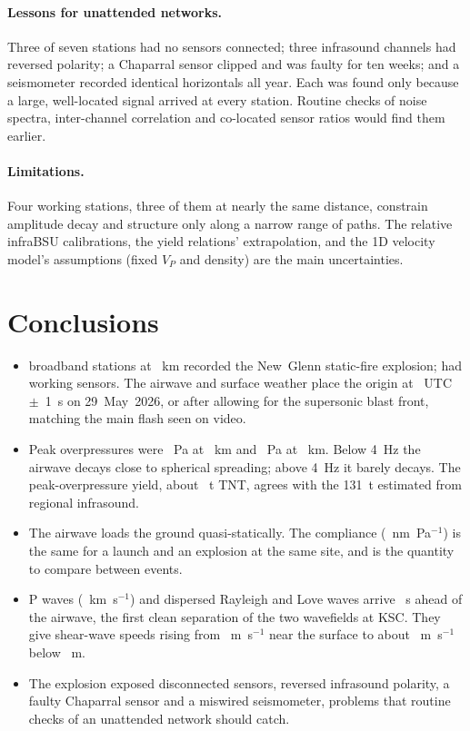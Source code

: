 \documentclass[]{seismica}
\begin{document}
\paragraph{Lessons for unattended networks.} Three of seven stations had
no sensors connected; three infrasound channels had reversed polarity; a
Chaparral sensor clipped and was faulty for ten weeks; and a seismometer
recorded identical horizontals all year. Each was found only because a
large, well-located signal arrived at every station. Routine checks of
noise spectra, inter-channel correlation and co-located sensor ratios
would find them earlier.

\paragraph{Limitations.} Four working stations, three of them at nearly
the same distance, constrain amplitude decay and structure only along a
narrow range of paths. The relative infraBSU calibrations, the yield
relations' extrapolation, and the 1D velocity model's assumptions (fixed
$V_P$ and density) are the main uncertainties.

\section{Conclusions}

\begin{itemize}
  \item \NGnStationsCap{} broadband stations at \NGdistRange~km recorded the New~Glenn
    static-fire explosion; \NGnWorking{} had working sensors. The airwave and
    surface weather place the origin at \NGorigin~UTC~$\pm$~1~s on
    29~May~2026, or \NGoriginCorrRange{} after allowing for the supersonic blast
    front, matching the main flash seen on video.
  \item Peak overpressures were \NGpBtwenty~Pa at \NGdistBtwenty~km and \NGpFar~Pa at
    \NGfarRange~km. Below 4~Hz the airwave decays close to spherical
    spreading; above 4~Hz it barely decays. The peak-overpressure yield,
    about \NGyieldP~t TNT, agrees with the 131~t estimated from regional
    infrasound.
  \item The airwave loads the ground quasi-statically. The compliance
    (\NGcompRange~nm~Pa$^{-1}$) is the same for a launch and an explosion at
    the same site, and is the quantity to compare between events.
  \item P waves (\NGvFirst~km~s$^{-1}$) and dispersed Rayleigh and Love
    waves arrive \NGlead~s ahead of the airwave, the first clean
    separation of the two wavefields at KSC. They give shear-wave speeds
    rising from \NGvsTop~m~s$^{-1}$ near the surface to about
    \NGvsHalfRound~m~s$^{-1}$ below \NGhalfDepth~m.
  \item The explosion exposed disconnected sensors, reversed infrasound
    polarity, a faulty Chaparral sensor and a miswired seismometer,
    problems that routine checks of an unattended network should catch.
\end{itemize}
\end{document}
